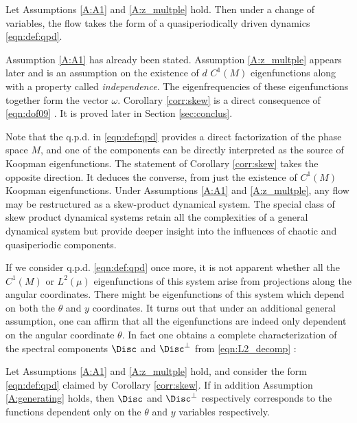 \documentclass[12pt,oneside]{article}
\begin{document}
\begin{corollary}  \label{corr:skew}
	Let Assumptions \ref{A:A1} and \ref{A:z_multple} hold. Then under a change of variables, the flow takes the form of a quasiperiodically driven dynamics \eqref{eqn:def:qpd}. 
\end{corollary}

Assumption \ref{A:A1} has already been stated. Assumption \ref{A:z_multple} appears later and is an assumption on the existence of $d$ $C^1(M)$ eigenfunctions along with a property called \emph{independence}. The eigenfrequencies of these eigenfunctions together form the vector $\omega$. Corollary \ref{corr:skew} is a direct consequence of \eqref{eqn:dof09} . It is proved later in Section \ref{sec:conclus}. 

Note that the q.p.d. in \eqref{eqn:def:qpd} provides a direct factorization of the phase space $M$, and one of the components can be directly interpreted as the source of Koopman eigenfunctions. The statement of Corollary \ref{corr:skew} takes the opposite direction. It deduces the converse, from just the existence of $C^1(M)$ Koopman eigenfunctions. Under Assumptions \ref{A:A1} and \ref{A:z_multple}, any flow may be restructured as a skew-product dynamical system. The special class of skew product dynamical systems retain all the complexities of a general dynamical system but provide deeper insight into the influences of chaotic and quasiperiodic components. %

If we consider  q.p.d. \eqref{eqn:def:qpd} once more, it is not apparent whether all the $C^1(M)$ or $L^2(\mu)$ eigenfunctions of this system arise from projections along the angular coordinates. There might be eigenfunctions of this system which depend on both the $\theta$ and $y$ coordinates. It turns out that under an additional general assumption, one can affirm that all the eigenfunctions are indeed only dependent on the angular coordinate $\theta$. In fact one obtains a complete characterization of the spectral components $\Disc$ and $\Disc^\bot$ from \eqref{eqn:L2_decomp} : 

\begin{corollary}  \label{corr:spectral_charac}
	Let Assumptions \ref{A:A1} and \ref{A:z_multple} hold, and consider the form \eqref{eqn:def:qpd} claimed by Corollary \ref{corr:skew}. If in addition Assumption \ref{A:generating} holds, then $\Disc$ and $\Disc^\bot$ respectively corresponds to the functions dependent only on the $\theta$ and $y$ variables respectively. 
\end{corollary}
\end{document}
